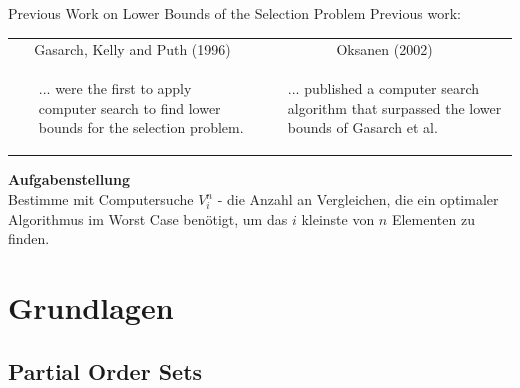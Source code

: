 \begin{frame}{Previous Work on Lower Bounds of the Selection Problem}
  \vspace{7mm}
  Previous work:\\
  \vspace{5mm}
  \begin{tabular}{|p{6cm}|p{6cm}|}
    \hline
    \multicolumn{1}{|c|}{Gasarch, Kelly and Puth (1996)}                                                                  & \multicolumn{1}{c|}{Oksanen (2002)} \\
    \cline{1-2}
    \raggedright \begin{itemize}
                   \item [...]were the first to apply computer search to find lower bounds for the selection problem.
                 \end{itemize} &
    \begin{itemize}
      \item[...] published a computer search algorithm that surpassed the lower bounds of Gasarch et al.
    \end{itemize}                                             \\
    \cline{1-2}
  \end{tabular}

\end{frame}

\begin{frame}{\insertsection}
  \textbf{Aufgabenstellung} \\
  \vspace{5mm}
  Bestimme mit Computersuche $V_i^n$ - die Anzahl an Vergleichen, die ein optimaler Algorithmus im Worst Case benötigt, um das $i$ kleinste von $n$ Elementen zu finden.

\end{frame}


\section{Grundlagen}

\subsection{Partial Order Sets}

\sectionframe{\insertsection}

